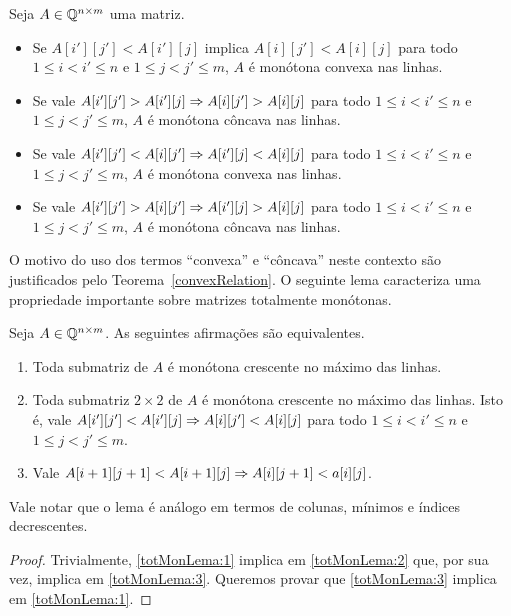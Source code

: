 \begin{defi}
Seja $A \in \mathbb{Q}^{n \times m}$ uma matriz.
    \begin{itemize}
        \item Se $A[i'][j'] < A[i'][j]$ implica $A[i][j'] < A[i][j]$ para todo $1 \leq i < i' \leq n$ e $1 \leq j < j' \leq m$, $A$ é monótona convexa nas linhas.
        \item Se vale $A[i'][j'] > A[i'][j] \Rightarrow A[i][j'] > A[i][j]$ para todo $1 \leq i < i' \leq n$ e $1 \leq j < j' \leq m$, $A$ é monótona côncava nas linhas.
        \item Se vale $A[i'][j'] < A[i][j'] \Rightarrow A[i'][j] < A[i][j]$ para todo $1 \leq i < i' \leq n$ e $1 \leq j < j' \leq m$, $A$ é monótona convexa nas linhas.
        \item Se vale $A[i'][j'] > A[i][j'] \Rightarrow A[i'][j] > A[i][j]$ para todo $1 \leq i < i' \leq n$ e $1 \leq j < j' \leq m$, $A$ é monótona côncava nas linhas.
    \end{itemize}
\end{defi}

O motivo do uso dos termos ``convexa'' e ``côncava'' neste contexto são justificados pelo Teorema~\ref{convexRelation}. O seguinte lema caracteriza uma propriedade importante sobre matrizes totalmente monótonas.  

\begin{lema}
Seja $A \in \mathbb{Q}^{n \times m}$. As seguintes afirmações são equivalentes.
    \begin{enumerate}
        \item Toda submatriz de $A$ é monótona crescente no máximo das linhas. \label{totMonLema:1}
        \item Toda submatriz $2 \times 2$ de $A$ é monótona crescente no máximo das linhas. Isto é, vale $A[i'][j'] < A[i'][j] \Rightarrow A[i][j'] < A[i][j]$ para todo $1 \leq i < i' \leq n$ e $1 \leq j < j' \leq m$. \label{totMonLema:2}
        \item Vale $A[i+1][j+1] < A[i+1][j] \Rightarrow A[i][j+1] < a[i][j]$. \label{totMonLema:3}
    \end{enumerate}
Vale notar que o lema é análogo em termos de colunas, mínimos e índices decrescentes.
\end{lema}

\begin{proof}
Trivialmente, \eqref{totMonLema:1} implica em \eqref{totMonLema:2} que, por sua vez, implica em \eqref{totMonLema:3}. Queremos provar que \eqref{totMonLema:3} implica em \eqref{totMonLema:1}.
\end{proof}
